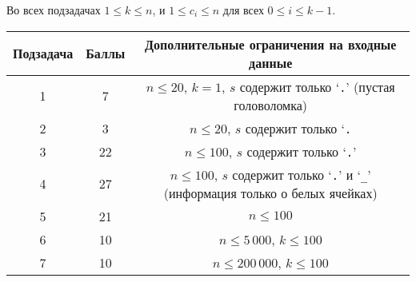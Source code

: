 Во всех подзадачах $1 \le k \le n$, и $1\le c_i\le n$ для всех $0 \le i \le k - 1$.

\begin{center}
\renewcommand{\arraystretch}{1.5}
\begin{tabular}{|c|c|c|}
\hline
Подзадача & Баллы & Дополнительные ограничения на входные данные\\
\hline
1 & 7 & $n\leq 20$, $k = 1$, $s$ содержит только `\texttt{.}' (пустая головоломка) \\
\hline
2 & 3 & $n\leq 20$, $s$ содержит только `\texttt{.} \\
\hline
3 & 22 & $n\leq 100$, $s$ содержит только `\texttt{.}' \\
\hline
4 & 27 & $n\leq 100$, $s$ содержит только `\texttt{.}' и `\texttt{\_}' (информация только о белых ячейках) \\
\hline
5 & 21 & $n\leq 100$ \\
\hline
6 & 10 & $n\leq 5\,000$, $k\leq 100$ \\
\hline
7 & 10 & $n\leq 200\,000$, $k\leq 100$ \\
\hline
\end{tabular}
\end{center}
